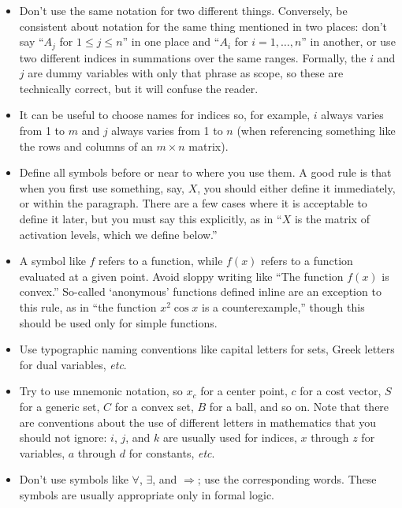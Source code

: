 \documentclass[12pt]{article}
\begin{document}
\begin{itemize}
\item Don't use the same notation for two different things. Conversely, be consistent
about notation for the same thing mentioned in two places: don't
say ``$A_j$ for $1 \leq j \leq n$'' in one place and ``$A_i$ for $i=1,\ldots,n$'' 
in another, or use two different indices in summations over the same ranges. 
Formally, the $i$ and $j$ are dummy variables with only that phrase as scope,
so these are technically correct, but it will confuse the reader.

\item It can be useful to choose names for indices so, for example, $i$
always varies from 1 to $m$ and $j$ always varies from 1 to $n$ (when
referencing something like the rows and columns of an $m \times n$ matrix).

\item Define all symbols before or near to where you use them.  A good rule is that
when you first use something, say, $X$, you should either define it immediately, or 
within the paragraph.   There are a few cases where it is acceptable to define it 
later, but you must say this explicitly, as in ``$X$ is the matrix of activation
levels, which we define below.''

\item A symbol like $f$ refers to a function, while $f(x)$ refers to a
function evaluated at a given point. Avoid sloppy writing like ``The function
$f(x)$ is convex.''
So-called `anonymous' functions defined inline are an exception to this rule,
as in ``the function $x^2 \cos x$ is a counterexample,'' though this should
be used only for simple functions.

\item Use typographic naming conventions like capital letters for sets, Greek
letters for dual variables, \emph{etc}.

\item Try to use mnemonic notation, so $x_c$ for a center point,
$c$ for a cost vector, $S$ for a generic set, $C$ for a convex set, $B$
for a ball, and so on. Note that there are conventions about
the use of different letters in mathematics that you should not ignore:
$i$, $j$, and $k$ are usually used for indices, $x$ through $z$ for
variables, $a$ through $d$ for constants, \emph{etc}.

\item Don't use symbols like $\forall$, $\exists$, and $\Rightarrow$; use the
corresponding words. These symbols are usually appropriate only in
formal logic. 


\end{itemize}
\end{document}
